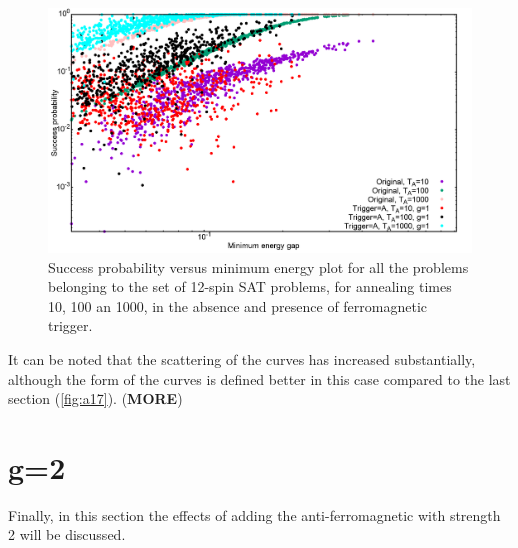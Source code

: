 \documentclass[12]{article}
\begin{document}
\begin{figure}[H]
\centering 
\includegraphics[scale=0.3]{SuccVsGap_OA_g1.png}
\caption{Success probability versus minimum energy plot for all the problems belonging to the set of 12-spin SAT problems, for annealing times 10, 100 an 1000, in the absence and presence of ferromagnetic trigger.}
\label{fig:a30}
\end{figure}
It can be noted that the scattering of the curves has increased substantially, although the form of the curves is defined better in this case compared to the last section (\ref{fig:a17}). (\textbf{MORE})


\section*{g=2}
Finally, in this section the effects of adding the anti-ferromagnetic with strength 2 will be discussed. 
\end{document}
